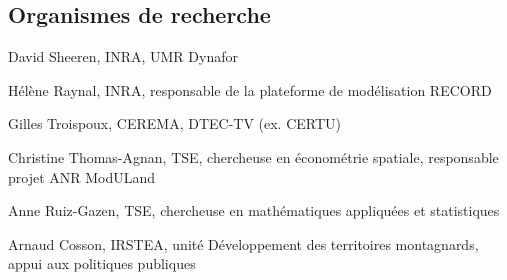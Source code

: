 \subsection{Organismes de recherche}

\startitemize[5,packed]
\item David Sheeren, INRA, UMR Dynafor
\item Hélène Raynal, INRA, responsable de la plateforme de modélisation RECORD
\item Gilles Troispoux, CEREMA, DTEC-TV (ex. CERTU)
\item Christine Thomas-Agnan, TSE, chercheuse en économétrie spatiale, responsable projet ANR ModULand
\item Anne Ruiz-Gazen, TSE, chercheuse en mathématiques appliquées et statistiques
\item Arnaud Cosson, IRSTEA, unité Développement des territoires montagnards, appui aux politiques publiques
\stopitemize
